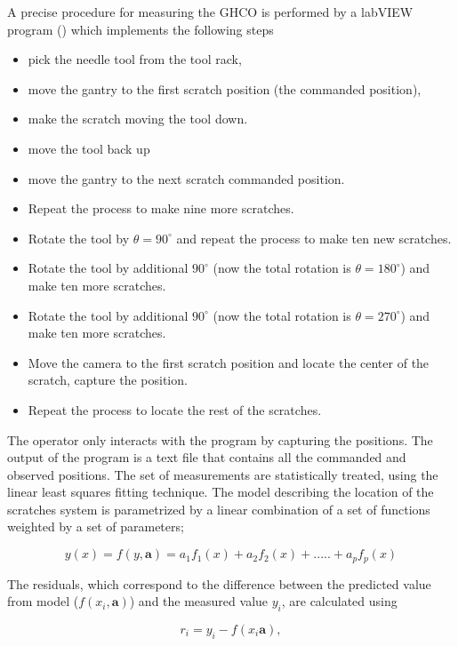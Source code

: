 A precise procedure for measuring the GHCO is performed by a labVIEW program () which implements the following steps 

\begin{itemize}
\item pick the needle tool from the tool rack,
\item move the gantry to the first scratch position (the commanded position),
\item make the scratch moving the tool down.
\item move the tool back up
\item move the gantry to the next scratch commanded position.
\item Repeat the process to make nine more scratches.
\item Rotate the tool by $\theta=90^\circ$ and repeat the process to make ten new scratches.
\item Rotate the tool by additional $90^\circ$ (now the total rotation is $\theta=180^\circ$) and make ten more scratches.
\item Rotate the tool by additional $90^\circ$ (now the total rotation is $\theta=270^\circ$) and make ten more scratches.
\item Move the camera to the first scratch position and locate the center of the scratch, capture the position.
\item Repeat the process to locate the rest of the scratches.   
\end{itemize}

The operator only interacts with the program by capturing the positions. The output of the program is a text file that contains all the commanded and observed positions. The set of measurements are statistically treated, using the linear least squares fitting technique. The model describing the location of the scratches system is parametrized by a linear combination of a set of functions weighted by a set of parameters;

\begin{equation}
y(x)= f(y,\textbf{a})=a_1f_1(x)+a_2f_2(x)+.....+a_pf_p(x)
\end{equation}

The residuals, which correspond to the difference between the predicted value from model ($f(x_i, \textbf{a})$) and the measured value $y_i$, are calculated using 

\begin{equation}
r_i= y_i - f(x_i\textbf{a}),
\end{equation}


